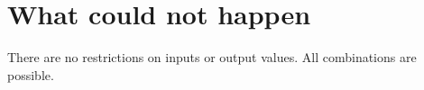 \section{What could not happen}

There are no restrictions on inputs or output values. All combinations are possible.
    